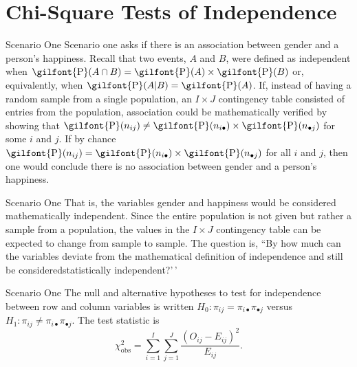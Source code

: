 \documentclass[
  ignorenonframetext,
]{beamer}
\begin{document}
\hypertarget{chi-square-tests-of-independence}{%
\section{Chi-Square Tests of
Independence}\label{chi-square-tests-of-independence}}

\begin{frame}{Scenario One}
\protect\hypertarget{scenario-one-2}{}
Scenario one asks if there is an association between gender and a
person's happiness. Recall that two events, \(A\) and \(B\), were
defined as independent when
\(\textrm{\gilfont{P}}\normalfont (A \cap B)=\textrm{\gilfont{P}}\normalfont (A)\times \textrm{\gilfont{P}}\normalfont (B)\)
or, equivalently, when
\(\textrm{\gilfont{P}}\normalfont (A|B)=\textrm{\gilfont{P}}\normalfont (A)\).
If, instead of having a random sample from a single population, an
\(I \times J\) contingency table consisted of entries from the
population, association could be mathematically verified by showing that
\(\textrm{\gilfont{P}}\normalfont (n_{ij}) \ne \textrm{\gilfont{P}}\normalfont (n_{i\bullet}) \times \textrm{\gilfont{P}}\normalfont (n_{\bullet j})\)
for some \(i\) and \(j\). If by chance
\(\textrm{\gilfont{P}}\normalfont (n_{ij}) = \textrm{\gilfont{P}}\normalfont (n_{i\bullet}) \times \textrm{\gilfont{P}}\normalfont (n_{\bullet j})\)
for all \(i\) and \(j\), then one would conclude there is no association
between gender and a person's happiness.
\end{frame}

\begin{frame}{Scenario One}
\protect\hypertarget{scenario-one-3}{}
That is, the variables gender and happiness would be considered
mathematically independent. Since the entire population is not given but
rather a sample from a population, the values in the \(I \times J\)
contingency table can be expected to change from sample to sample. The
question is, ``By how much can the variables deviate from the
mathematical definition of independence and still be
consideredstatistically independent?'\,'
\end{frame}

\begin{frame}{Scenario One}
\protect\hypertarget{scenario-one-4}{}
The null and alternative hypotheses to test for independence between row
and column variables is written
\(H_0: \pi_{ij}=\pi_{i\bullet}\pi_{\bullet j}\) versus
\(H_1:\pi_{ij} \ne \pi_{i\bullet}\pi_{\bullet j}\). The test statistic
is \begin{equation}\label{ChiSqStatIndep} \chi_{\text{obs}}^2
=\sum_{i=1}^I\sum_{j=1}^J \frac{(O_{ij} - E_{ij})^2}{E_{ij}}.
\end{equation}
\end{frame}
\end{document}
